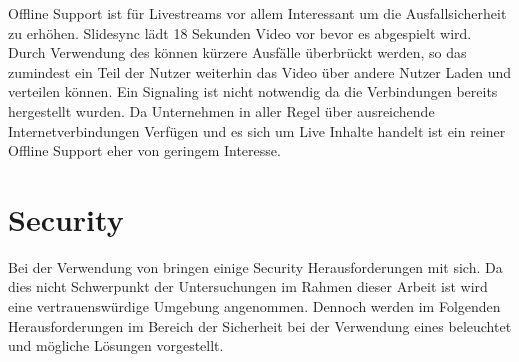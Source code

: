 Offline Support ist für Livestreams vor allem Interessant um die Ausfallsicherheit zu erhöhen. Slidesync lädt 18 Sekunden Video vor bevor es abgespielt wird. Durch Verwendung des \pTp \cdn können kürzere Ausfälle überbrückt werden, so das zumindest ein Teil der Nutzer weiterhin das Video über andere Nutzer Laden und verteilen können. Ein Signaling ist nicht notwendig da die Verbindungen bereits hergestellt wurden. Da Unternehmen in aller Regel über ausreichende Internetverbindungen Verfügen und es sich um Live Inhalte handelt ist ein reiner Offline Support eher von geringem Interesse. 


\section{Security}
Bei der Verwendung von \pTp \cdns bringen einige Security Herausforderungen mit sich. Da dies nicht Schwerpunkt der Untersuchungen im Rahmen dieser Arbeit ist wird eine vertrauenswürdige Umgebung angenommen. Dennoch werden im Folgenden Herausforderungen im Bereich der Sicherheit bei der Verwendung eines \pTp \cdns beleuchtet und mögliche Lösungen vorgestellt.

